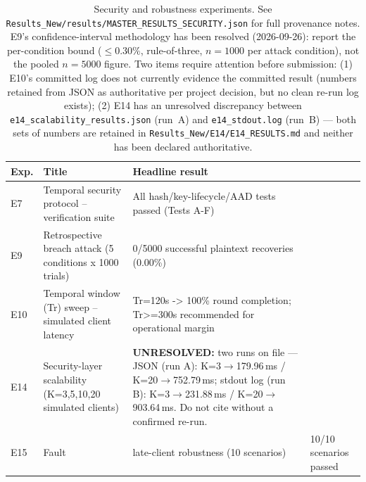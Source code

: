 \begin{table}[t]
\centering
\small
\begin{tabular}{lp{4cm}p{6cm}}
\toprule
Exp. & Title & Headline result \\
\midrule
E7 & Temporal security protocol -- verification suite & All hash/key-lifecycle/AAD tests passed (Tests A-F) \\
E9 & Retrospective breach attack (5 conditions x 1000 trials) & 0/5000 successful plaintext recoveries (0.00\%) \\
E10 & Temporal window (Tr) sweep -- simulated client latency & Tr=120s -> 100\% round completion; Tr>=300s recommended for operational margin \\
E14 & Security-layer scalability (K=3,5,10,20 simulated clients) & \textbf{UNRESOLVED:} two runs on file --- JSON (run A): K=3$\to$179.96\,ms / K=20$\to$752.79\,ms; stdout log (run B): K=3$\to$231.88\,ms / K=20$\to$903.64\,ms. Do not cite without a confirmed re-run. \\
E15 & Fault & late-client robustness (10 scenarios) & 10/10 scenarios passed \\
\bottomrule
\end{tabular}
\caption{Security and robustness experiments. See \texttt{Results\_New/results/MASTER\_RESULTS\_SECURITY.json} for full provenance notes. E9's confidence-interval methodology has been resolved (2026-09-26): report the per-condition bound ($\le 0.30\%$, rule-of-three, $n=1000$ per attack condition), not the pooled $n=5000$ figure. Two items require attention before submission: (1) E10's committed log does not currently evidence the committed result (numbers retained from JSON as authoritative per project decision, but no clean re-run log exists); (2) E14 has an unresolved discrepancy between \texttt{e14\_scalability\_results.json} (run~A) and \texttt{e14\_stdout.log} (run~B) --- both sets of numbers are retained in \texttt{Results\_New/E14/E14\_RESULTS.md} and neither has been declared authoritative.}
\label{tab:master-results-security}
\end{table}

